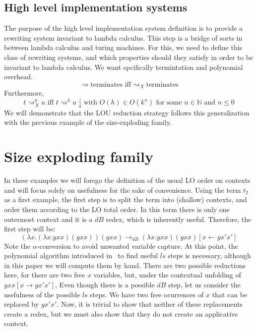 \documentclass[12pt]{article}
\begin{document}
\subsection{High level implementation systems}
The purpose of the high level implementation system definition is to provide a rewriting system invariant to lambda calculus. This step is a bridge of sorts in between lambda calculus and turing machines. For this, we need to define this class of rewriting systems, and which properties should they satisfy in order to be invariant to lambda calculus. We want spcifically termintation and polynomial overhead.
\[\rightsquigarrow \text{terminates iff} {\rightsquigarrow}_{X} \text{terminates}\]
Furthermore,
\[t {\rightsquigarrow}_{X}^k u \text{ iff } t {\rightsquigarrow}^h u\downarrow \text{with } O(h) \in O(k^n) \text{ for some } n \in \mathbb{N} \text{ and } n \leq 0 \]
We will demonstrate that the LOU reduction strategy follows this generalization with the previous example of the size-exploding family.
\section{Size exploding family}
In these examples we will forego the definition of the usual LO order on contexts and will focus solely on usefulness for the sake of convenience.
Using the term $t_2$ as a first example, the first step is to split the term into (shallow) contexts, and order them according to the LO total order. In this term there is only one outermost context and it is a $dB$ redex, which is inherently useful. Therefore, the first step will be:
\begin{equation*}
  (\lambda x . (\lambda x . yxx) (yxx))(yxx) \rightarrow_{dB} (\lambda x . yxx)(yxx)[x \leftarrow yx'x']
\end{equation*}
Note the $\alpha$-conversion to avoid unwanted variable capture. At this point, the polynomial algorithm introduced in~\cite{beta-invariance} to find useful $ls$ steps is necessary, although in this paper we will compute them by hand. There are two possible reductions here, for there are two free $x$ variables, but, under the contextual unfolding of $yxx[x \rightarrow yx'x']$,
Even though there is a possible $dB$ step, let us consider the usefulness of the possible $ls$ steps. We have two free ocurrences of $x$ that can be replaced by $yx'x'$. Now, it is trivial to show that neither of these replacements create a redex, but we must also show that they do not create an applicative context.
\end{document}
